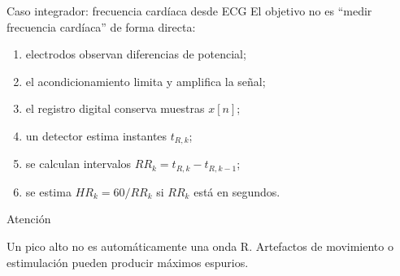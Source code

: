 \documentclass[
  10pt,
  ignorenonframetext,
  aspectratio=169,
  spanish,
]{beamer}
\providecommand{\tightlist}{%
  \setlength{\itemsep}{0pt}\setlength{\parskip}{0pt}}
\begin{document}
\begin{frame}{Caso integrador: frecuencia cardíaca desde ECG}
\label{d1-015}
El objetivo no es ``medir frecuencia cardíaca'' de forma directa:

\begin{enumerate}
\tightlist
\item
  electrodos observan diferencias de potencial;
\item
  el acondicionamiento limita y amplifica la señal;
\item
  el registro digital conserva muestras \(x[n]\);
\item
  un detector estima instantes \(t_{R,k}\);
\item
  se calculan intervalos \(RR_k=t_{R,k}-t_{R,k-1}\);
\item
  se estima \(HR_k=60/RR_k\) si \(RR_k\) está en segundos.
\end{enumerate}

\begin{alertblock}{Atención}

Un pico alto no es automáticamente una onda R. Artefactos de movimiento
o estimulación pueden producir máximos espurios.

\end{alertblock}

\end{frame}
\end{document}
